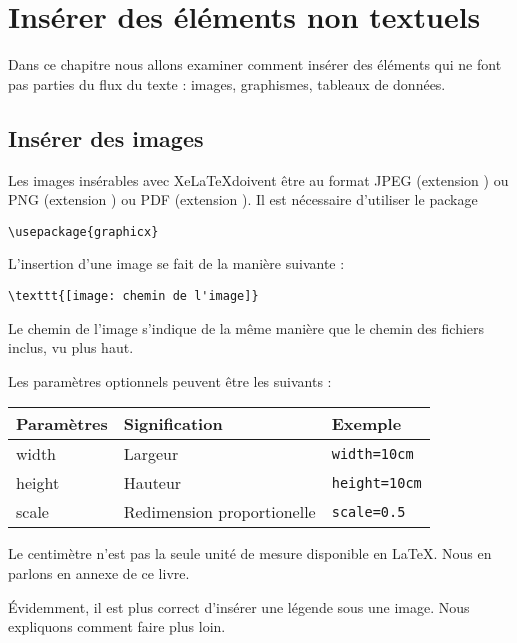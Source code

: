 \chapter{Insérer des éléments non textuels}

\begin{prealable}
	Dans ce chapitre nous allons examiner comment insérer des éléments qui ne font pas parties du flux du texte : images, graphismes, tableaux de données.
\end{prealable}

\section{Insérer des images}

Les images insérables avec Xe\LaTeX doivent être au format JPEG (extension ) ou PNG (extension ) ou PDF (extension ). Il est nécessaire d'utiliser le package 

\begin{verbatim}
\usepackage{graphicx}
\end{verbatim}

L'insertion d'une image se fait de la manière suivante :
\begin{verbatim}
\texttt{[image: chemin de l'image]}
\end{verbatim}

Le chemin de l'image s'indique de la même manière que le chemin des fichiers inclus, vu plus haut.

Les paramètres optionnels peuvent être les suivants :

\begin{longtable}{l||l|l}
	Paramètres & Signification & Exemple	\\
	\hline
	\endhead
	width		& Largeur 	& \verb|width=10cm| 	\\
	height		& Hauteur	& \verb|height=10cm|	 \\
	scale		& Redimension proportionelle & \verb|scale=0.5|\\
	
\end{longtable}

\begin{anedocte}
Le centimètre n'est pas la seule  unité de mesure disponible en \LaTeX. Nous en parlons en annexe de ce livre.
\end{anedocte}

\begin{attention}
	Évidemment, il est plus correct d'insérer une légende sous une image. Nous expliquons comment faire plus loin.
\end{attention}


